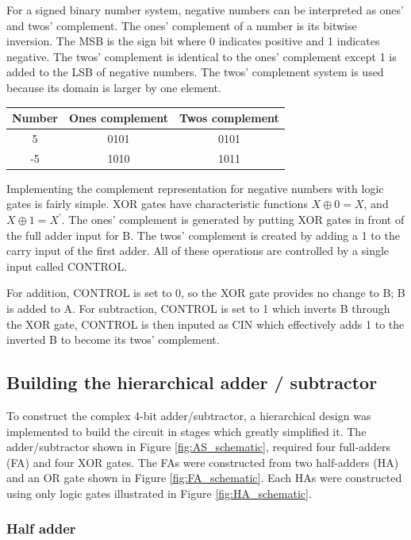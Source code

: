 \documentclass[11pt]{article}
\begin{document}
For a signed binary number system, negative numbers can be interpreted as ones' and twos' complement. The ones' complement of a number is its bitwise inversion. The MSB is the sign bit where 0 indicates positive and 1 indicates negative. The twos' complement is identical to the ones' complement except 1 is added to the LSB of negative numbers. The twos' complement system is used because its domain is larger by one element.

\begin{table}[htpb]
	\centering
	\begin{tabular}{ c c c }
		Number & Ones complement & Twos complement \\
		\midrule
		5  & 0101 & 0101 \\
		-5 & 1010 & 1011 \\
	\end{tabular}
\end{table}

Implementing the complement representation for negative numbers with logic gates is fairly simple. XOR gates have characteristic functions $X \oplus 0 = X$, and  $X \oplus  1 = X^\prime$. The ones' complement is generated by putting XOR gates in front of the full adder input for B. The twos' complement is created by adding a 1 to the carry input of the first adder. All of these operations are controlled by a single input called CONTROL.

For addition, CONTROL is set to 0, so the XOR gate provides no change to B; B is added to A. For subtraction, CONTROL is set to 1 which inverts B through the XOR gate, CONTROL is then inputed as CIN which effectively adds 1 to the inverted B to become its twos' complement.

\subsection{Building the hierarchical adder / subtractor}

To construct the complex 4-bit adder/subtractor, a hierarchical design was implemented to build the circuit in stages which greatly simplified it. The adder/subtractor shown in Figure \ref{fig:AS_schematic}, required four full-adders (FA) and four XOR gates. The FAs were constructed from two half-adders (HA) and an OR gate shown in Figure \ref{fig:FA_schematic}. Each HAs were constructed using only logic gates illustrated in Figure \ref{fig:HA_schematic}.

\subsubsection{Half adder}
\end{document}
